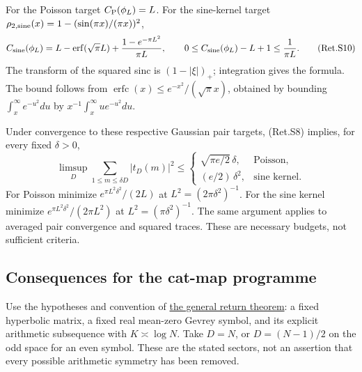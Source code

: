 For the Poisson target \(C_{\rm P}(\phi_L)=L\). For the sine-kernel target
\(\rho_{2,\rm sine}(x)=1-(\sin(\pi x)/(\pi x))^2\),
\[
 C_{\rm sine}(\phi_L)=L-\operatorname{erf}(\sqrt\pi L)
                         +\frac{1-e^{-\pi L^2}}{\pi L},
 \qquad0\le C_{\rm sine}(\phi_L)-L+1\le\frac1{\pi L}.            \tag{Ret.S10}
\]
The transform of the squared sinc is \((1-|\xi|)_+\); integration gives the
formula. The bound follows from
\(\operatorname{erfc}(x)\le e^{-x^2}/(\sqrt\pi x)\), obtained by bounding
\(\int_x^\infty e^{-u^2}du\) by \(x^{-1}\int_x^\infty u e^{-u^2}du\).

Under convergence to these respective Gaussian pair targets, (Ret.S8) implies,
for every fixed \(\delta>0\),
\[
 \limsup_D\sum_{1\le m\le\delta D}|t_D(m)|^2\le
 \begin{cases}\sqrt{\pi e/2}\,\delta,&\text{Poisson},\\
                 (e/2)\,\delta^2,&\text{sine kernel}.
 \end{cases}                                                     \tag{Ret.S11}
\]
For Poisson minimize \(e^{\pi L^2\delta^2}/(2L)\) at
\(L^2=(2\pi\delta^2)^{-1}\). For the sine kernel minimize
\(e^{\pi L^2\delta^2}/(2\pi L^2)\) at \(L^2=(\pi\delta^2)^{-1}\).
The same argument applies to averaged pair convergence and squared traces.
These are necessary budgets, not sufficient criteria.

\hypertarget{consequences-for-the-cat-map-programme}{%
\subsection{Consequences for the cat-map programme}\label{consequences-for-the-cat-map-programme}}

Use the hypotheses and convention of
\href{https://github.com/ChurilovMaksim/BGS/blob/main/mathematics/returns/general_cat_return_laws.md}{the general return theorem}: a fixed hyperbolic
matrix, a fixed real mean-zero Gevrey symbol, and its explicit arithmetic
subsequence with \(K\asymp\log N\). Take \(D=N\), or \(D=(N-1)/2\) on the odd
space for an even symbol. These are the stated sectors, not an assertion
that every possible arithmetic symmetry has been removed.

